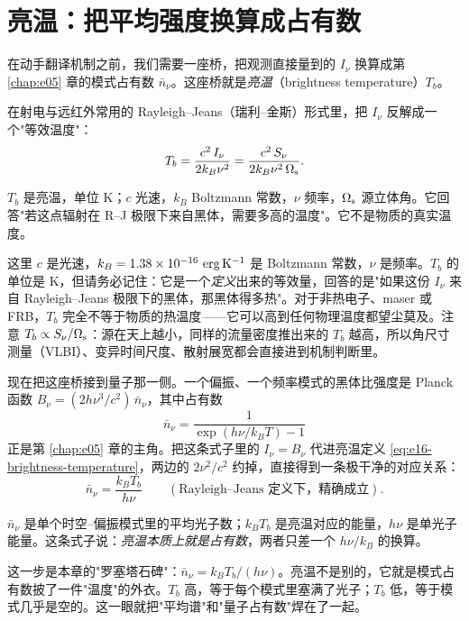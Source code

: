 \section{亮温：把平均强度换算成占有数}
\label{sec:e16-brightness}

在动手翻译机制之前，我们需要一座桥，把观测直接量到的 \(I_\nu\) 换算成第 \ref{chap:e05} 章的模式占有数 \(\bar n_\nu\)。这座桥就是\emph{亮温}（brightness temperature）\(T_b\)。

在射电与远红外常用的 Rayleigh--Jeans（瑞利--金斯）形式里，把 \(I_\nu\) 反解成一个"等效温度"：
\begin{equation}
  T_b=\frac{c^2\,I_\nu}{2k_B\nu^2}
      =\frac{c^2\,S_\nu}{2k_B\nu^2\,\Omega_{\rm s}} .
  \label{eq:e16-brightness-temperature}
\end{equation}
\begin{formulaexplain}
\(T_b\) 是亮温，单位 K；\(c\) 光速，\(k_B\) Boltzmann 常数，\(\nu\) 频率，\(\Omega_{\rm s}\) 源立体角。它回答"若这点辐射在 R--J 极限下来自黑体，需要多高的温度"。它不是物质的真实温度。
\end{formulaexplain}
这里 \(c\) 是光速，\(k_B=1.38\times10^{-16}~{\rm erg\,K^{-1}}\) 是 Boltzmann 常数，\(\nu\) 是频率。\(T_b\) 的单位是 K，但请务必记住：它是一个\emph{定义}出来的等效量，回答的是"如果这份 \(I_\nu\) 来自 Rayleigh--Jeans 极限下的黑体，那黑体得多热"。对于非热电子、maser 或 FRB，\(T_b\) 完全不等于物质的热温度——它可以高到任何物理温度都望尘莫及。注意 \(T_b\propto S_\nu/\Omega_{\rm s}\)：源在天上越小，同样的流量密度推出来的 \(T_b\) 越高，所以角尺寸测量（VLBI）、变异时间尺度、散射展宽都会直接进到机制判断里。

现在把这座桥接到量子那一侧。一个偏振、一个频率模式的黑体比强度是 Planck 函数 \(B_\nu=(2h\nu^3/c^2)\,\bar n_\nu\)，其中占有数
\[
  \bar n_\nu=\frac{1}{\exp(h\nu/k_BT)-1}
\]
正是第 \ref{chap:e05} 章的主角。把这条式子里的 \(I_\nu=B_\nu\) 代进亮温定义 \eqref{eq:e16-brightness-temperature}，两边的 \(2\nu^2/c^2\) 约掉，直接得到一条极干净的对应关系：
\begin{equation}
  \bar n_\nu=\frac{k_B T_b}{h\nu}
  \qquad(\text{Rayleigh--Jeans 定义下，精确成立}).
  \label{eq:e16-occupation-from-tb}
\end{equation}
\begin{formulaexplain}
\(\bar n_\nu\) 是单个时空--偏振模式里的平均光子数；\(k_B T_b\) 是亮温对应的能量，\(h\nu\) 是单光子能量。这条式子说：\emph{亮温本质上就是占有数}，两者只差一个 \(h\nu/k_B\) 的换算。
\end{formulaexplain}
这一步是本章的"罗塞塔石碑"：\(\bar n_\nu=k_B T_b/(h\nu)\)。亮温不是别的，它就是模式占有数披了一件"温度"的外衣。\(T_b\) 高，等于每个模式里塞满了光子；\(T_b\) 低，等于模式几乎是空的。这一眼就把"平均谱"和"量子占有数"焊在了一起。

